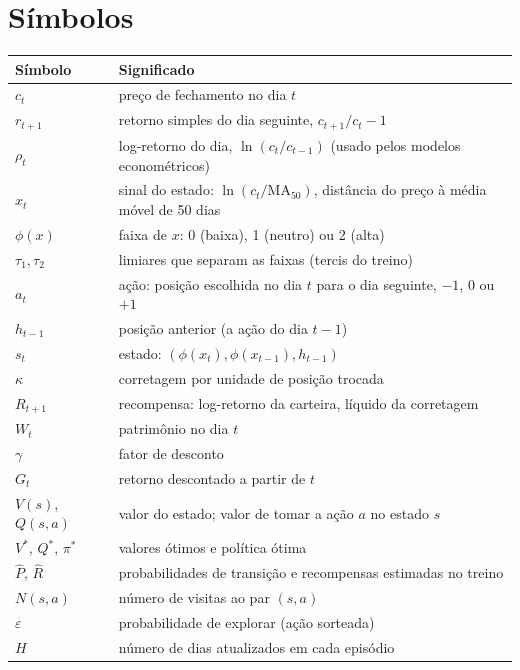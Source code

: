 \documentclass[11pt,a4paper]{article}
\begin{document}
\section*{Símbolos}

\begin{center}
\small
\begin{tabular}{l L{12.5cm}}
  \toprule
  \textbf{Símbolo} & \textbf{Significado} \\
  \midrule
  $c_t$                     & preço de fechamento no dia $t$ \\
  $r_{t+1}$                 & retorno simples do dia seguinte, $c_{t+1}/c_t - 1$ \\
  $\rho_t$                  & log-retorno do dia, $\ln(c_t/c_{t-1})$ (usado pelos modelos econométricos) \\
  $x_t$                     & sinal do estado: $\ln(c_t/\mathrm{MA}_{50})$, distância do preço à média móvel de 50 dias \\
  $\phi(x)$                 & faixa de $x$: 0 (baixa), 1 (neutro) ou 2 (alta) \\
  $\tau_1, \tau_2$          & limiares que separam as faixas (tercis do treino) \\
  $a_t$                     & ação: posição escolhida no dia $t$ para o dia seguinte, $-1$, $0$ ou $+1$ \\
  $h_{t-1}$                 & posição anterior (a ação do dia $t-1$) \\
  $s_t$                     & estado: $(\phi(x_t), \phi(x_{t-1}), h_{t-1})$ \\
  $\kappa$                  & corretagem por unidade de posição trocada \\
  $R_{t+1}$                 & recompensa: log-retorno da carteira, líquido da corretagem \\
  $W_t$                     & patrimônio no dia $t$ \\
  $\gamma$                  & fator de desconto \\
  $G_t$                     & retorno descontado a partir de $t$ \\
  $V(s)$, $Q(s,a)$          & valor do estado; valor de tomar a ação $a$ no estado $s$ \\
  $V^*$, $Q^*$, $\pi^*$     & valores ótimos e política ótima \\
  $\widehat{P}$, $\widehat{R}$ & probabilidades de transição e recompensas estimadas no treino \\
  $N(s,a)$                  & número de visitas ao par $(s,a)$ \\
  $\varepsilon$             & probabilidade de explorar (ação sorteada) \\
  $H$                       & número de dias atualizados em cada episódio \\
  \bottomrule
\end{tabular}
\end{center}
\end{document}
